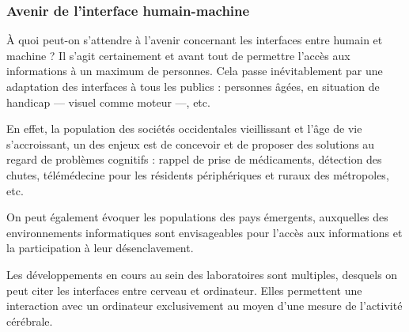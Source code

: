 \subsubsection[Avenir de l'\textsc{Ihm}]{Avenir de l'interface humain-machine}
\label{subsub:I.3.1.5}

À quoi peut-on s'attendre à l'avenir concernant les interfaces entre humain et machine ? 
Il s'agit certainement et avant tout de permettre l'accès aux informations à un maximum de personnes. Cela passe inévitablement par une adaptation des interfaces à tous les publics : personnes âgées, en situation de handicap --- visuel comme moteur ---, etc. 

En effet, la population des sociétés occidentales vieillissant et l'âge de vie s'accroissant, un des enjeux est de concevoir et de proposer des solutions au regard de problèmes cognitifs : rappel de prise de médicaments, détection des chutes, télémédecine pour les résidents périphériques et ruraux des métropoles, etc.

On peut également évoquer les populations des pays émergents, auxquelles des environnements informatiques sont envisageables pour l'accès aux informations et la participation à leur désenclavement.

Les développements en cours au sein des laboratoires sont multiples, desquels on peut citer les interfaces entre cerveau et ordinateur. Elles permettent une interaction avec un ordinateur exclusivement au moyen d'une mesure de l'activité cérébrale.

